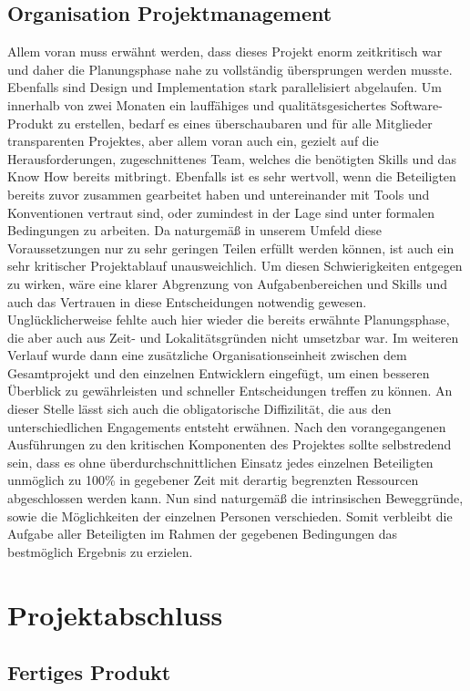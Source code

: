 \documentclass[12pt,a4paper]{article}
\begin{document}
\subsection{Organisation Projektmanagement}
Allem voran muss erwähnt werden, dass dieses Projekt enorm zeitkritisch war und daher die Planungsphase nahe zu vollständig übersprungen werden musste. Ebenfalls sind Design und Implementation stark parallelisiert abgelaufen. Um innerhalb von zwei Monaten ein lauffähiges und qualitätsgesichertes Software-Produkt zu erstellen, bedarf es eines überschaubaren und für alle Mitglieder transparenten Projektes, aber allem voran auch ein, gezielt auf die Herausforderungen, zugeschnittenes Team, welches die benötigten Skills und das Know How bereits mitbringt. Ebenfalls ist es sehr wertvoll, wenn die Beteiligten bereits zuvor zusammen gearbeitet haben und untereinander mit Tools und Konventionen vertraut sind, oder zumindest in der Lage sind unter formalen Bedingungen zu arbeiten. Da naturgemäß in unserem Umfeld diese Voraussetzungen nur zu sehr geringen Teilen erfüllt werden können, ist auch ein sehr kritischer Projektablauf unausweichlich. Um diesen Schwierigkeiten entgegen zu wirken, wäre eine klarer Abgrenzung von Aufgabenbereichen
und Skills und auch das Vertrauen in diese Entscheidungen notwendig gewesen. Unglücklicherweise fehlte auch hier wieder die bereits erwähnte Planungsphase, die aber auch aus Zeit- und Lokalitätsgründen nicht umsetzbar war. Im weiteren Verlauf wurde dann eine zusätzliche Organisationseinheit zwischen dem Gesamtprojekt und den einzelnen Entwicklern eingefügt, um einen besseren Überblick zu gewährleisten und schneller Entscheidungen treffen zu können. An dieser Stelle lässt sich auch die obligatorische Diffizilität, die aus den unterschiedlichen Engagements entsteht erwähnen. Nach den vorangegangenen Ausführungen zu den kritischen Komponenten des Projektes sollte selbstredend sein, dass es ohne überdurchschnittlichen Einsatz jedes einzelnen Beteiligten
unmöglich zu 100\% in gegebener Zeit mit derartig begrenzten Ressourcen abgeschlossen werden kann. Nun sind naturgemäß die intrinsischen Beweggründe, sowie die Möglichkeiten der einzelnen Personen verschieden. Somit verbleibt die Aufgabe aller Beteiligten im Rahmen der gegebenen
Bedingungen das bestmöglich Ergebnis zu erzielen.
\newpage
\section{Projektabschluss}
\subsection{Fertiges Produkt}
\end{document}
